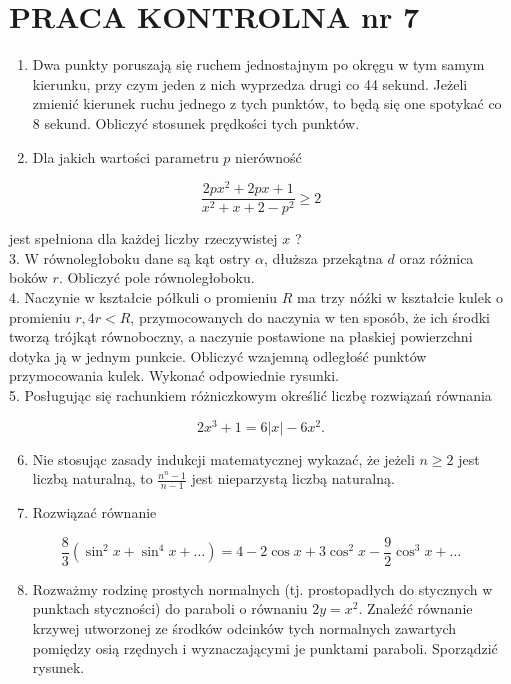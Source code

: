 \documentclass[10pt]{article}
\begin{document}
\section*{PRACA KONTROLNA nr 7}
\begin{enumerate}
  \item Dwa punkty poruszają się ruchem jednostajnym po okręgu w tym samym kierunku, przy czym jeden z nich wyprzedza drugi co 44 sekund. Jeżeli zmienić kierunek ruchu jednego z tych punktów, to będą się one spotykać co 8 sekund. Obliczyć stosunek prędkości tych punktów.
  \item Dla jakich wartości parametru $p$ nierówność
\end{enumerate}

$$
\frac{2 p x^{2}+2 p x+1}{x^{2}+x+2-p^{2}} \geqslant 2
$$

jest spełniona dla każdej liczby rzeczywistej $x$ ?\\
3. W równoległoboku dane są kąt ostry $\alpha$, dłuższa przekątna $d$ oraz różnica boków $r$. Obliczyć pole równoległoboku.\\
4. Naczynie w kształcie półkuli o promieniu $R$ ma trzy nóźki w kształcie kulek o promieniu $r, 4 r<R$, przymocowanych do naczynia w ten sposób, że ich środki tworzą trójkąt równoboczny, a naczynie postawione na płaskiej powierzchni dotyka ją w jednym punkcie. Obliczyć wzajemną odległość punktów przymocowania kulek. Wykonać odpowiednie rysunki.\\
5. Posługując się rachunkiem różniczkowym określić liczbę rozwiązań równania

$$
2 x^{3}+1=6|x|-6 x^{2} .
$$

\begin{enumerate}
  \setcounter{enumi}{5}
  \item Nie stosując zasady indukcji matematycznej wykazać, że jeżeli $n \geqslant 2$ jest liczbą naturalną, to $\frac{n^{n}-1}{n-1}$ jest nieparzystą liczbą naturalną.
  \item Rozwiązać równanie
\end{enumerate}

$$
\frac{8}{3}\left(\sin ^{2} x+\sin ^{4} x+\ldots\right)=4-2 \cos x+3 \cos ^{2} x-\frac{9}{2} \cos ^{3} x+\ldots
$$

\begin{enumerate}
  \setcounter{enumi}{7}
  \item Rozważmy rodzinę prostych normalnych (tj. prostopadłych do stycznych w punktach styczności) do paraboli o równaniu $2 y=x^{2}$. Znaleźć równanie krzywej utworzonej ze środków odcinków tych normalnych zawartych pomiędzy osią rzędnych i wyznaczającymi je punktami paraboli. Sporządzić rysunek.
\end{enumerate}
\end{document}

